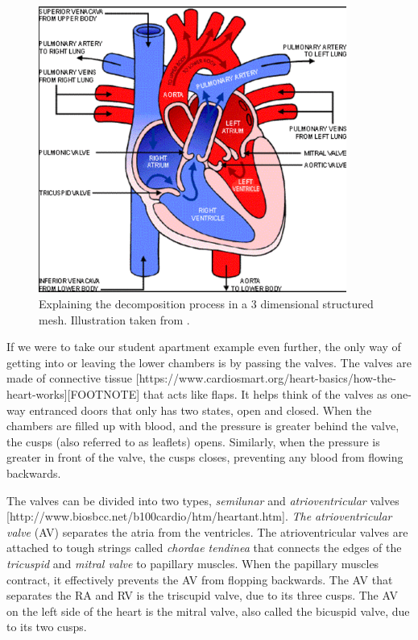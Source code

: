\begin{figure}[h]
 \centering 
     \includegraphics[width=0.9\textwidth]{bilder/b_heart_structure_new}
     \caption{Explaining the decomposition process in a 3 dimensional structured mesh. Illustration taken from \cite{article9}.
     \label{b_heart_structure_new.png}}
\end{figure}

If we were to take our student apartment example even further, the only way of getting into or leaving the lower chambers is by passing the valves. The valves are made of connective tissue [https://www.cardiosmart.org/heart-basics/how-the-heart-works][FOOTNOTE] that acts like flaps. It helps think of the valves as one-way entranced doors that only has two states, open and closed. When the chambers are filled up with blood, and the pressure is greater behind the valve, the cusps (also referred to as leaflets) opens. Similarly, when the pressure is greater in front of the valve, the cusps closes, preventing any blood from flowing backwards. 

The valves can be divided into two types, \textit{semilunar} and \textit{atrioventricular} valves [http://www.biosbcc.net/b100cardio/htm/heartant.htm]. \textit{The atrioventricular valve} (AV) separates the atria from the ventricles. The atrioventricular valves are attached to tough strings called \textit{chordae tendinea} that connects the edges of the \textit{tricuspid} and  \textit{mitral valve} to papillary muscles. When the papillary muscles contract, it effectively prevents the AV from flopping backwards. %
The  AV that separates the RA and RV is the triscupid valve, due to its three cusps. The AV on the left side of the heart is the mitral valve, also called the bicuspid valve, due to its two cusps. 


